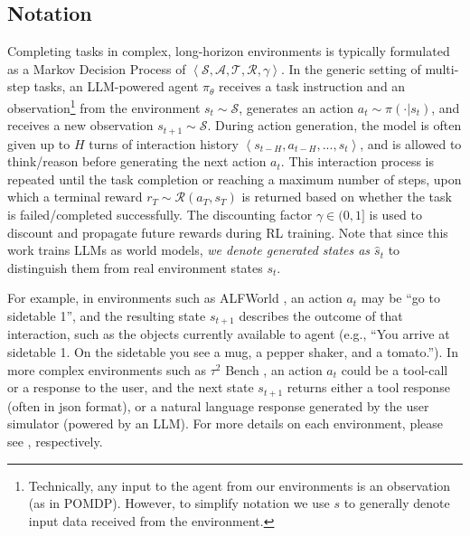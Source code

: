 \documentclass{article}
\theoremstyle{plain}
\theoremstyle{definition}
\theoremstyle{remark}
\begin{document}
\subsection{Notation}
\label{subsec:Notation}
Completing tasks in complex, long-horizon environments is typically formulated as a Markov Decision Process of $\left\langle \mathcal{S}, \mathcal{A}, \mathcal{T}, \mathcal{R}, \gamma \right\rangle$.
In the generic setting of multi-step tasks, an LLM-powered agent $\pi_\theta$ receives a task instruction and an observation\footnote{Technically, any input to the agent from our environments is an observation (as in POMDP). However, to simplify notation we use $s$ to generally denote input data received from the environment.} from the environment $s_{t} \sim \mathcal{S}$, generates an action $a_{t} \sim \pi(\cdot | s_t)$, and receives a new observation $s_{t+1} \sim \mathcal{S}$.
During action generation, the model is often given up to $H$ turns of interaction history $\left\langle s_{t-H}, a_{t-H}, ..., s_t\right\rangle$, and is allowed to think/reason before generating the next action $a_{t}$.
This interaction process is repeated until the task completion or reaching a maximum number of steps, upon which a terminal reward $r_{T} \sim \mathcal{R}(a_T,s_T)$ is returned based on whether the task is failed/completed successfully.
The discounting factor $\gamma \in (0,1]$ is used to discount and propagate future rewards during RL training.
Note that since this work trains LLMs as world models, \emph{we denote generated states as $\hat{s}_t$} to distinguish them from real environment states $s_t$.

For example, in environments such as ALFWorld \citep{shridhar2021alfworldaligningtextembodied}, an action $a_{t}$ may be ``go to sidetable 1'', and the resulting state $s_{t+1}$ describes the outcome of that interaction, such as the objects currently available to agent (e.g., ``You arrive at sidetable 1. On the sidetable you see a mug, a pepper shaker, and a tomato.'').
In more complex environments such as $\tau^2$ Bench \citep{barres2025tau2benchevaluatingconversationalagents}, an action $a_{t}$ could be a tool-call or a response to the user, and the next state $s_{t+1}$ returns either a tool response (often in json format), or a natural language response generated by the user simulator (powered by an LLM).
For more details on each environment, please see , respectively.
\end{document}
